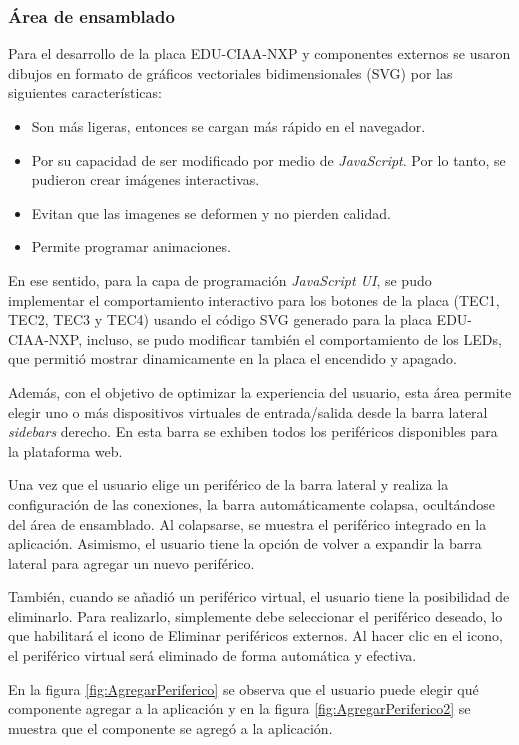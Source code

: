\subsubsection{Área de ensamblado}

Para el desarrollo de la placa EDU-CIAA-NXP y componentes externos se usaron dibujos en formato de gráficos vectoriales bidimensionales (SVG) por las siguientes características:

\begin{itemize}
	\item Son más ligeras, entonces se cargan más rápido en el navegador.
    \item Por su capacidad de ser modificado por medio de \textit{JavaScript}. Por lo tanto, se pudieron crear imágenes interactivas.
	\item Evitan que las imagenes se deformen y no pierden calidad.
	\item Permite programar animaciones.
\end{itemize}

En ese sentido, para la capa de programación \textit{JavaScript UI}, se pudo implementar el comportamiento interactivo para los botones de la placa (TEC1, TEC2, TEC3 y TEC4) usando el código SVG generado para la placa EDU-CIAA-NXP, incluso, se pudo modificar también el comportamiento de los LEDs, que permitió mostrar dinamicamente en la placa el encendido y apagado.

Además, con el objetivo de optimizar la experiencia del usuario, esta área permite elegir uno o más dispositivos virtuales de entrada/salida desde la barra lateral \textit{sidebars} derecho. En esta barra se exhiben todos los periféricos disponibles para la plataforma web. 

Una vez que el usuario elige un periférico de la barra lateral y realiza la configuración de las conexiones, la barra automáticamente colapsa, ocultándose del área de ensamblado. Al colapsarse, se muestra el periférico integrado en la aplicación. Asimismo,  el usuario tiene la opción de volver a expandir la barra lateral para agregar un nuevo periférico.

También, cuando se añadió un periférico virtual, el usuario tiene la posibilidad de eliminarlo. Para realizarlo, simplemente debe seleccionar el periférico deseado, lo que habilitará el icono de \textquotedbl Eliminar periféricos externos\textquotedbl. Al hacer clic en el icono, el periférico virtual será eliminado de forma automática y efectiva.


En la figura \ref{fig:AgregarPeriferico} se observa que el usuario puede elegir qué componente agregar a la aplicación y en la figura \ref{fig:AgregarPeriferico2} se muestra que el componente se agregó a la aplicación.
\hfill \break
\hfill \break
\hfill \break
\hfill \break
\hfill \break
\hfill \break
\hfill \break
\hfill \break
\hfill \break
\hfill \break
\hfill \break
\hfill \break
\hfill \break




